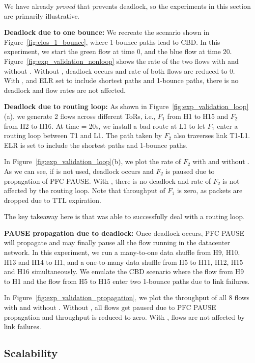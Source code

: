 We have already {\em proved} that \sysname{} prevents deadlock, so the
experiments in this section are primarily illustrative.

\textbf{Deadlock due to one bounce:} We recreate the scenario shown in
Figure~\ref{fig:clos_1_bounce}, where 1-bounce paths lead to CBD.  In this
experiment, we start the green flow at time 0, and the blue flow at time 20.
Figure~\ref{fig:exp_validation_nonloop} shows the rate of the two flows with and
without \sysname{}.  Without \sysname{}, deadlock occurs and rate of both flows
are reduced to 0. With \sysname{}, and ELR set to include shortest paths and
1-bounce paths, there is no deadlock and flow rates are not affected.

\textbf{Deadlock due to routing loop:} As shown in
Figure~\ref{fig:exp_validation_loop}(a), we generate 2 flows across different
ToRs, i.e.,  $F_1$ from H1 to H15 and $F_2$ from H2 to H16. At time = 20s, we
install a bad route at L1 to let $F_1$ enter a routing loop between T1 and L1.
The path taken by $F_2$ also traverses link T1-L1.  ELR is set to include the
shortest paths and 1-bounce paths.

In Figure~\ref{fig:exp_validation_loop}(b), we plot the rate of $F_2$ with and
without \sysname{}. As we can see, if \sysname{} is not used, deadlock occurs
and $F_2$ is paused due to propagation of PFC PAUSE. With \sysname{}, there is
no deadlock and rate of $F_2$ is not affected by the routing loop. Note that
throughput of $F_1$ is zero, as packets are dropped due to TTL expiration.

The key takeaway here is that \sysname{} was able to successfully deal with a
routing loop.

\textbf{PAUSE propagation due to deadlock:} Once deadlock occurs, PFC PAUSE will propagate and may finally pause all the flow running in the datacenter network. In this experiment, we run a many-to-one data shuffle from H9, H10, H13 and H14 to H1, and a one-to-many data shuffle from H5 to  H11, H12, H15 and H16 simultaneously.  We emulate the CBD scenario where the flow from H9 to H1 and the flow from H5 to H15 enter two 1-bounce paths due to link failures. 

In Figure~\ref{fig:exp_validation_propagation}, we plot the throughput of all 8 flows with and without \sysname{}. Without \sysname{}, all flows get paused due to PFC PAUSE propagation and throughput is reduced to zero. With \sysname{}, flows are not affected by link failures.


\subsection{Scalability}
\label{subsec:exp_overhead}

